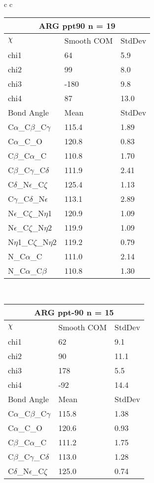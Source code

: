 \begin{longtable}{ c c }
\begin{tabular}{ l l l }
  \toprule
  \multicolumn{3}{c}{ARG \textbf{ppt90} n = 19} \\ \toprule
  $\chi$       & Smooth COM & StdDev \\ \midrule
  chi1 & 64 & 5.9 \\ 
  chi2 & 99 & 8.0 \\ 
  chi3 & -180 & 9.8 \\ 
  chi4 & 87 & 13.0 \\ \midrule
  Bond Angle   & Mean     & StdDev \\ \midrule
  C$\alpha$\_C$\beta$\_C$\gamma$ & 115.4 & 1.89\\
  C$\alpha$\_C\_O & 120.8 & 0.83\\
  C$\beta$\_C$\alpha$\_C & 110.8 & 1.70\\
  C$\beta$\_C$\gamma$\_C$\delta$ & 111.9 & 2.41\\
  C$\delta$\_N$\epsilon$\_C$\zeta$ & 125.4 & 1.13\\
  C$\gamma$\_C$\delta$\_N$\epsilon$ & 113.1 & 2.89\\
  N$\epsilon$\_C$\zeta$\_N$\eta$1 & 120.9 & 1.09\\
  N$\epsilon$\_C$\zeta$\_N$\eta$2 & 119.9 & 1.09\\
  N$\eta$1\_C$\zeta$\_N$\eta$2 & 119.2 & 0.79\\
  N\_C$\alpha$\_C & 111.0 & 2.14\\
  N\_C$\alpha$\_C$\beta$ & 110.8 & 1.30\\
  \bottomrule
  \end{tabular}
  \\
  \begin{tabular}{ l l l }
  \toprule
  \multicolumn{3}{c}{ARG \textbf{ppt-90} n = 15} \\ \toprule
  $\chi$       & Smooth COM & StdDev \\ \midrule
  chi1 & 62 & 9.1 \\ 
  chi2 & 90 & 11.1 \\ 
  chi3 & 178 & 5.5 \\ 
  chi4 & -92 & 14.4 \\ \midrule
  Bond Angle   & Mean     & StdDev \\ \midrule
  C$\alpha$\_C$\beta$\_C$\gamma$ & 115.8 & 1.38\\
  C$\alpha$\_C\_O & 120.6 & 0.93\\
  C$\beta$\_C$\alpha$\_C & 111.2 & 1.75\\
  C$\beta$\_C$\gamma$\_C$\delta$ & 113.0 & 1.28\\
  C$\delta$\_N$\epsilon$\_C$\zeta$ & 125.0 & 0.74\\

\end{tabular}
\end{longtable}
